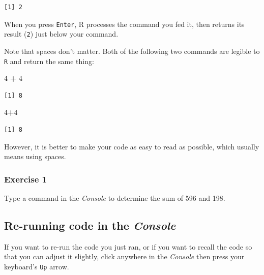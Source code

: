 \documentclass[
]{book}
\newenvironment{Shaded}{\begin{snugshade}}{\end{snugshade}}
\newcommand{\DecValTok}[1]{\textcolor[rgb]{0.00,0.00,0.81}{#1}}
\newcommand{\OperatorTok}[1]{\textcolor[rgb]{0.81,0.36,0.00}{\textbf{#1}}}
\newcommand{\StringTok}[1]{\textcolor[rgb]{0.31,0.60,0.02}{#1}}
\begin{document}
\begin{verbatim}
[1] 2
\end{verbatim}

When you press \texttt{Enter}, R processes the command you fed it, then returns its result (\texttt{2}) just below your command.

Note that spaces don't matter. Both of the following two commands are legible to \texttt{R} and return the same thing:

\begin{Shaded}
\begin{Highlighting}[]
\DecValTok{4} \OperatorTok{+}\StringTok{ }\DecValTok{4}
\end{Highlighting}
\end{Shaded}

\begin{verbatim}
[1] 8
\end{verbatim}

\begin{Shaded}
\begin{Highlighting}[]
\DecValTok{4}\OperatorTok{+}\DecValTok{4}
\end{Highlighting}
\end{Shaded}

\begin{verbatim}
[1] 8
\end{verbatim}

However, it is better to make your code as easy to read as possible, which usually means using spaces.

\hypertarget{exercise-1}{%
\subsubsection*{Exercise 1}\label{exercise-1}}

Type a command in the \emph{Console} to determine the sum of 596 and 198.

\hypertarget{re-running-code-in-the-console}{%
\subsection*{\texorpdfstring{Re-running code in the \emph{Console}}{Re-running code in the Console}}\label{re-running-code-in-the-console}}

If you want to re-run the code you just ran, or if you want to recall the code so that you can adjust it slightly, click anywhere in the \emph{Console} then press your keyboard's \texttt{Up} arrow.
\end{document}
